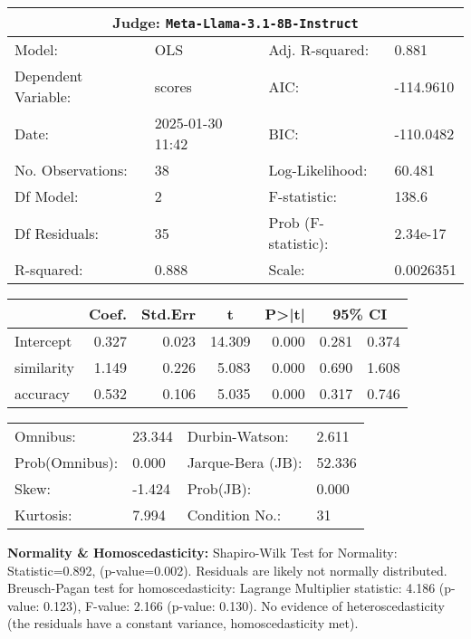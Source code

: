 \begin{center}
\small
\begin{tabular}{llll}
\toprule
\multicolumn{4}{c}{\textbf{Judge:} \texttt{Meta-Llama-3.1-8B-Instruct} \citep{grattafiori2024llama3herdmodels}} \\
\midrule
Model: & OLS & Adj. R-squared: & 0.881 \\
Dependent Variable: & scores & AIC: & -114.9610 \\
Date: & 2025-01-30 11:42 & BIC: & -110.0482 \\
No. Observations: & 38 & Log-Likelihood: & 60.481 \\
Df Model: & 2 & F-statistic: & 138.6 \\
Df Residuals: & 35 & Prob (F-statistic): & 2.34e-17 \\
R-squared: & 0.888 & Scale: & 0.0026351 \\
\bottomrule
\end{tabular}

\vspace{5pt}
\begin{tabular}{lrrrrrr}
\toprule
 & \multicolumn{1}{c}{Coef.} & \multicolumn{1}{c}{Std.Err} & \multicolumn{1}{c}{t} & \multicolumn{1}{c}{P>|t|} & \multicolumn{2}{c}{95\% CI} \\
\midrule
Intercept & 0.327 & 0.023 & 14.309 & 0.000 & 0.281 & 0.374 \\
similarity & 1.149 & 0.226 & 5.083 & 0.000 & 0.690 & 1.608 \\
accuracy & 0.532 & 0.106 & 5.035 & 0.000 & 0.317 & 0.746 \\
\bottomrule
\end{tabular}

\vspace{5pt}
\begin{tabular}{@{}ll@{\hspace{15pt}}ll@{}}
\toprule
Omnibus: & 23.344 & Durbin-Watson: & 2.611 \\
Prob(Omnibus): & 0.000 & Jarque-Bera (JB): & 52.336 \\
Skew: & -1.424 & Prob(JB): & 0.000 \\
Kurtosis: & 7.994 & Condition No.: & 31 \\
\bottomrule
\end{tabular}
\end{center}

\textbf{Normality \& Homoscedasticity:} Shapiro-Wilk Test for Normality: Statistic=0.892, (p-value=0.002).
Residuals are likely not normally distributed.
Breusch-Pagan test for homoscedasticity:
Lagrange Multiplier statistic: 4.186
(p-value: 0.123), 
F-value: 2.166
(p-value: 0.130). 
No evidence of heteroscedasticity (the residuals have a constant variance, homoscedasticity met).

